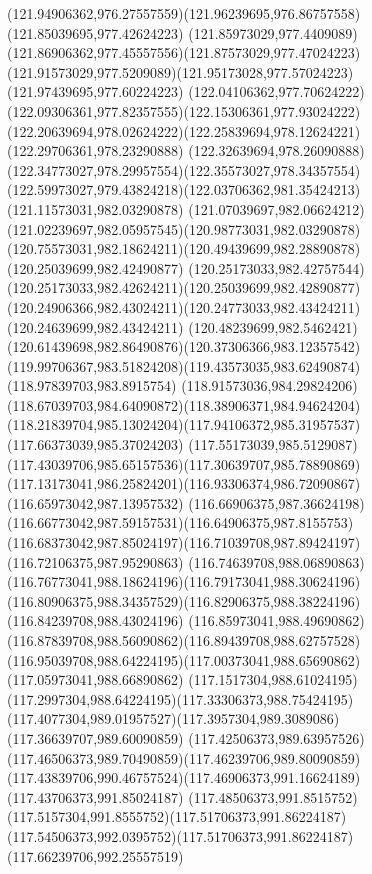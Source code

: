 {{  \curveto(121.94906362,976.27557559)(121.96239695,976.86757558)(121.85039695,977.42624223)
  \curveto(121.85973029,977.4409089)(121.86906362,977.45557556)(121.87573029,977.47024223)
  \curveto(121.91573029,977.5209089)(121.95173028,977.57024223)(121.97439695,977.60224223)
  \curveto(122.04106362,977.70624222)(122.09306361,977.82357555)(122.15306361,977.93024222)
  \curveto(122.20639694,978.02624222)(122.25839694,978.12624221)(122.29706361,978.23290888)
  \curveto(122.32639694,978.26090888)(122.34773027,978.29957554)(122.35573027,978.34357554)
  \curveto(122.59973027,979.43824218)(122.03706362,981.35424213)(121.11573031,982.03290878)
  \curveto(121.07039697,982.06624212)(121.02239697,982.05957545)(120.98773031,982.03290878)
  \curveto(120.75573031,982.18624211)(120.49439699,982.28890878)(120.25039699,982.42490877)
  \curveto(120.25173033,982.42757544)(120.25173033,982.42624211)(120.25039699,982.42890877)
  \curveto(120.24906366,982.43024211)(120.24773033,982.43424211)(120.24639699,982.43424211)
  \curveto(120.48239699,982.5462421)(120.61439698,982.86490876)(120.37306366,983.12357542)
  \curveto(119.99706367,983.51824208)(119.43573035,983.62490874)(118.97839703,983.8915754)
  \curveto(118.91573036,984.29824206)(118.67039703,984.64090872)(118.38906371,984.94624204)
  \curveto(118.21839704,985.13024204)(117.94106372,985.31957537)(117.66373039,985.37024203)
  \curveto(117.55173039,985.5129087)(117.43039706,985.65157536)(117.30639707,985.78890869)
  \curveto(117.13173041,986.25824201)(116.93306374,986.72090867)(116.65973042,987.13957532)
  \curveto(116.66906375,987.36624198)(116.66773042,987.59157531)(116.64906375,987.8155753)
  \curveto(116.68373042,987.85024197)(116.71039708,987.89424197)(116.72106375,987.95290863)
  \curveto(116.74639708,988.06890863)(116.76773041,988.18624196)(116.79173041,988.30624196)
  \curveto(116.80906375,988.34357529)(116.82906375,988.38224196)(116.84239708,988.43024196)
  \curveto(116.85973041,988.49690862)(116.87839708,988.56090862)(116.89439708,988.62757528)
  \curveto(116.95039708,988.64224195)(117.00373041,988.65690862)(117.05973041,988.66890862)
  \curveto(117.1517304,988.61024195)(117.2997304,988.64224195)(117.33306373,988.75424195)
  \curveto(117.4077304,989.01957527)(117.3957304,989.3089086)(117.36639707,989.60090859)
  \curveto(117.42506373,989.63957526)(117.46506373,989.70490859)(117.46239706,989.80090859)
  \curveto(117.43839706,990.46757524)(117.46906373,991.16624189)(117.43706373,991.85024187)
  \curveto(117.48506373,991.8515752)(117.5157304,991.8555752)(117.51706373,991.86224187)
  \curveto(117.54506373,992.0395752)(117.51706373,991.86224187)(117.66239706,992.25557519)
}}

